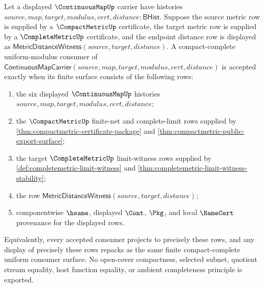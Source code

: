 \begin{theorem}
\label{thm:continuousmap-compact-complete-uniform-exact-consumer-surface}
Let a displayed $\ContinuousMapUp$ carrier have histories
$source,map,target,modulus,cert,distance:\mathsf{BHist}$. Suppose the source
metric row is supplied by a $\CompactMetricUp$ certificate, the target metric
row is supplied by a $\CompleteMetricUp$ certificate, and the endpoint
distance row is displayed as
$\mathsf{MetricDistanceWitness}(source,target,distance)$. A compact-complete
uniform-modulus consumer of
$\mathsf{ContinuousMapCarrier}(source,map,target,modulus,cert,distance)$ is
accepted exactly when its finite surface consists of the following rows:
\begin{enumerate}
  \item the six displayed $\ContinuousMapUp$ histories
  $source,map,target,modulus,cert,distance$;
  \item the $\CompactMetricUp$ finite-net and complete-limit rows supplied by
  \autoref{thm:compactmetric-certificate-package} and
  \autoref{thm:compactmetric-public-export-surface};
  \item the target $\CompleteMetricUp$ limit-witness rows supplied by
  \autoref{def:completemetric-limit-witness} and
  \autoref{thm:completemetric-limit-witness-stability};
  \item the row
  $\mathsf{MetricDistanceWitness}(source,target,distance)$;
  \item componentwise $\hsame$, displayed $\Cont$, $\Pkg$, and local
  $\NameCert$ provenance for the displayed rows.
\end{enumerate}
Equivalently, every accepted consumer projects to precisely these rows, and
any display of precisely these rows repacks as the same finite
compact-complete uniform consumer surface. No open-cover compactness,
selected subnet, quotient stream equality, host function equality, or ambient
completeness principle is exported.
\end{theorem}
